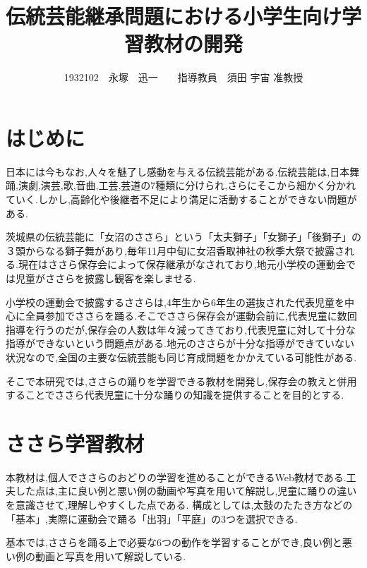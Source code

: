 \documentclass[twocolumn,10pt,a4j]{ltjsarticle}
\title{伝統芸能継承問題における小学生向け学習教材の開発}
\author{1932102　永塚　迅一　　指導教員　須田 宇宙 准教授}
\date{}
\begin{document}
\maketitle
\section{はじめに}


日本には今もなお,人々を魅了し感動を与える伝統芸能がある.伝統芸能は,日本舞踊,演劇,演芸,歌,音曲,工芸,芸道の7種類に分けられ,さらにそこから細かく分かれていく.しかし,高齢化や後継者不足により満足に活動することができない問題がある.

茨城県の伝統芸能に「女沼のささら」という「太夫獅子」「女獅子」「後獅子」の３頭からなる獅子舞があり,毎年11月中旬に女沼香取神社の秋季大祭で披露される\cite{suda2018}.現在はささら保存会によって保存継承がなされており,地元小学校の運動会では児童がささらを披露し観客を楽しませる.

小学校の運動会で披露するささらは,4年生から6年生の選抜された代表児童を中心に全員参加でささらを踊る.そこでささら保存会が運動会前に,代表児童に数回指導を行うのだが,保存会の人数は年々減ってきており,代表児童に対して十分な指導ができないという問題点がある.地元のささらが十分な指導ができていない状況なので,全国の主要な伝統芸能も同じ育成問題をかかえている可能性がある.

そこで本研究では,ささらの踊りを学習できる教材を開発し,保存会の教えと併用することでささら代表児童に十分な踊りの知識を提供することを目的とする.

\section{ささら学習教材}
本教材は,個人でささらのおどりの学習を進めることができるWeb教材である.工夫した点は,主に良い例と悪い例の動画や写真を用いて解説し,児童に踊りの違いを意識させて,理解しやすくした点である.
構成としては,太鼓のたたき方などの「基本」,実際に運動会で踊る「出羽」「平庭」の3つを選択できる.

基本では,ささらを踊る上で必要な6つの動作を学習することができ,良い例と悪い例の動画と写真を用いて解説している.
\end{document}
